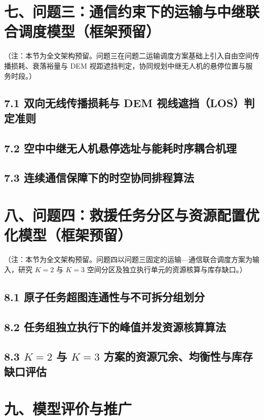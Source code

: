\documentclass[withoutpreface,bwprint]{format}
\begin{document}
\section{七、问题三：通信约束下的运输与中继联合调度模型（框架预留）}
{\kaishu （注：本节为全文架构预留。问题三在问题二运输调度方案基础上引入自由空间传播损耗、衰落裕量与 DEM 视距遮挡判定，协同规划中继无人机的悬停位置与服务时段。）}

\subsection{7.1 双向无线传播损耗与 DEM 视线遮挡（LOS）判定准则}
\subsection{7.2 空中中继无人机悬停选址与能耗时序耦合机理}
\subsection{7.3 连续通信保障下的时空协同排程算法}



\section{八、问题四：救援任务分区与资源配置优化模型（框架预留）}
{\kaishu （注：本节为全文架构预留。问题四以问题三固定的运输—通信联合调度方案为输入，研究 $K=2$ 与 $K=3$ 空间分区及独立执行单元的资源核算与库存缺口。）}

\subsection{8.1 原子任务超图连通性与不可拆分组划分}
\subsection{8.2 任务组独立执行下的峰值并发资源核算算法}
\subsection{\texorpdfstring{8.3 $K=2$ 与 $K=3$ 方案的资源冗余、均衡性与库存缺口评估}{8.3 K=2 与 K=3 方案的资源冗余、均衡性与库存缺口评估}}



\section{九、模型评价与推广}
\end{document}
